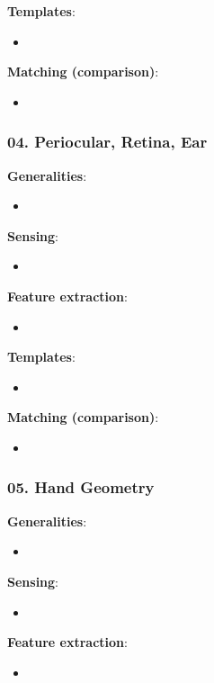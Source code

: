 \documentclass[a4paper]{article}
\begin{document}
      \textbf{Templates}:
      \begin{itemize}
        \item 
      \end{itemize}

      \textbf{Matching (comparison)}:
      \begin{itemize}
        \item 
      \end{itemize}
    \subsubsection*{04. Periocular, Retina, Ear}
      \textbf{Generalities}:
      \begin{itemize}
        \item 
      \end{itemize}

      \textbf{Sensing}:
      \begin{itemize}
        \item 
      \end{itemize}

      \textbf{Feature extraction}:
      \begin{itemize}
        \item 
      \end{itemize}

      \textbf{Templates}:
      \begin{itemize}
        \item 
      \end{itemize}

      \textbf{Matching (comparison)}:
      \begin{itemize}
        \item 
      \end{itemize}
    \subsubsection*{05. Hand Geometry}
      \textbf{Generalities}:
      \begin{itemize}
        \item 
      \end{itemize}

      \textbf{Sensing}:
      \begin{itemize}
        \item 
      \end{itemize}

      \textbf{Feature extraction}:
      \begin{itemize}
        \item 
      \end{itemize}
\end{document}
